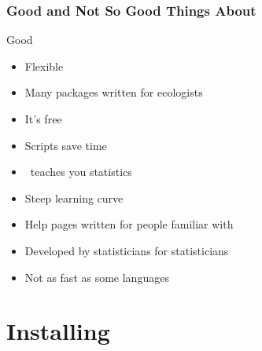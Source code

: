 \documentclass[color=usenames,dvipsnames]{beamer}\usepackage[]{graphicx}\usepackage[]{color}
\newcommand{\inr}[1]{\colorbox{inlinecolor}{\texttt{#1}}}
\begin{document}
\begin{frame}
  \frametitle{Good and Not So Good Things About \R}
  {\Large Good}
  \large
  \begin{itemize}%
    \item<1-> Flexible %
    \item<1-> Many packages written for ecologists
    \item<1-> It's free
    \item<1-> Scripts save time
    \item<1-> \R~teaches you statistics
  \end{itemize}
  \vspace{0.5cm}
  \begin{itemize}
    \item<2-> Steep learning curve
    \item<2-> Help pages written for people familiar with \R
    \item<2-> Developed by statisticians for statisticians
    \item<2-> Not as fast as some languages
  \end{itemize}
\end{frame}








\section{Installing \R}
\end{document}
